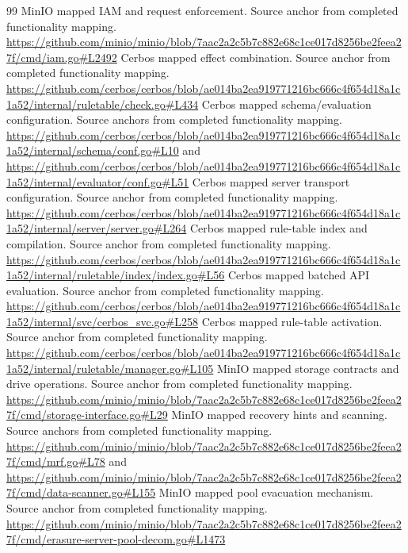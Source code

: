 \begin{thebibliography}{99}
\small
{} MinIO mapped IAM and request enforcement. Source anchor from completed functionality mapping. \url{https://github.com/minio/minio/blob/7aac2a2c5b7c882e68c1ce017d8256be2feea27f/cmd/iam.go#L2492}
 Cerbos mapped effect combination. Source anchor from completed functionality mapping. \url{https://github.com/cerbos/cerbos/blob/ae014ba2ea919771216bc666c4f654d18a1c1a52/internal/ruletable/check.go#L434}
 Cerbos mapped schema/evaluation configuration. Source anchors from completed functionality mapping. \url{https://github.com/cerbos/cerbos/blob/ae014ba2ea919771216bc666c4f654d18a1c1a52/internal/schema/conf.go#L10} and \url{https://github.com/cerbos/cerbos/blob/ae014ba2ea919771216bc666c4f654d18a1c1a52/internal/evaluator/conf.go#L51}
 Cerbos mapped server transport configuration. Source anchor from completed functionality mapping. \url{https://github.com/cerbos/cerbos/blob/ae014ba2ea919771216bc666c4f654d18a1c1a52/internal/server/server.go#L264}
 Cerbos mapped rule-table index and compilation. Source anchor from completed functionality mapping. \url{https://github.com/cerbos/cerbos/blob/ae014ba2ea919771216bc666c4f654d18a1c1a52/internal/ruletable/index/index.go#L56}
 Cerbos mapped batched API evaluation. Source anchor from completed functionality mapping. \url{https://github.com/cerbos/cerbos/blob/ae014ba2ea919771216bc666c4f654d18a1c1a52/internal/svc/cerbos_svc.go#L258}
 Cerbos mapped rule-table activation. Source anchor from completed functionality mapping. \url{https://github.com/cerbos/cerbos/blob/ae014ba2ea919771216bc666c4f654d18a1c1a52/internal/ruletable/manager.go#L105}
 MinIO mapped storage contracts and drive operations. Source anchor from completed functionality mapping. \url{https://github.com/minio/minio/blob/7aac2a2c5b7c882e68c1ce017d8256be2feea27f/cmd/storage-interface.go#L29}
 MinIO mapped recovery hints and scanning. Source anchors from completed functionality mapping. \url{https://github.com/minio/minio/blob/7aac2a2c5b7c882e68c1ce017d8256be2feea27f/cmd/mrf.go#L78} and \url{https://github.com/minio/minio/blob/7aac2a2c5b7c882e68c1ce017d8256be2feea27f/cmd/data-scanner.go#L155}
 MinIO mapped pool evacuation mechanism. Source anchor from completed functionality mapping. \url{https://github.com/minio/minio/blob/7aac2a2c5b7c882e68c1ce017d8256be2feea27f/cmd/erasure-server-pool-decom.go#L1473}

\end{thebibliography}
